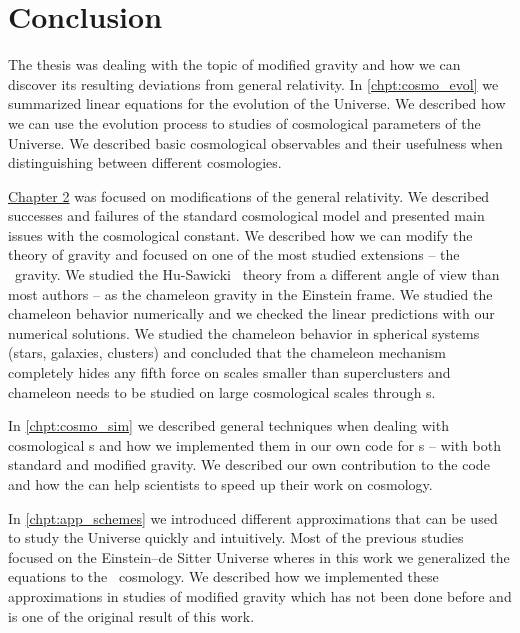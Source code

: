 \chapter*{Conclusion}
The thesis was dealing with the topic of modified gravity and how we can discover its resulting deviations from general relativity. In \autoref{chpt:cosmo_evol} we summarized linear equations for the evolution of the Universe. We described how we can use the evolution process to studies of cosmological parameters of the Universe. We described basic cosmological observables and their usefulness when distinguishing between different cosmologies.

\hyperref[chpt:de_mg]{Chapter 2} was focused on modifications of the general relativity. We described successes and failures of the standard cosmological model and presented main issues with the cosmological constant. We described how we can modify the theory of gravity and focused on one of the most studied extensions -- the \fR\ gravity. We studied the Hu-Sawicki \fR\ theory from a different angle of view than most authors -- as the chameleon gravity in the Einstein frame. We studied the chameleon behavior numerically and we checked the linear predictions with our numerical solutions. We studied the chameleon behavior in spherical systems (stars, galaxies, clusters) and concluded that the chameleon mechanism completely hides any fifth force on scales smaller than superclusters and chameleon needs to be studied on large cosmological scales through \nbodysim s. 

In \autoref{chpt:cosmo_sim} we described general techniques when dealing with cosmological \nbodysim s and how we implemented them in our own code for \nbodysim s -- with both standard and modified gravity. We described our own contribution to the  code and how the  can help scientists to speed up their work on cosmology.

In \autoref{chpt:app_schemes} we introduced different approximations that can be used to study the Universe quickly and intuitively. Most of the previous studies focused on the Einstein--de Sitter Universe wheres in this work we generalized the equations to the \LCDM\ cosmology. We described how we implemented these approximations in studies of modified gravity which has not been done before and is one of the original result of this work.

